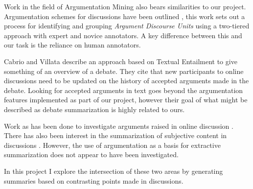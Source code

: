     Work in the field of Argumentation Mining also bears similarities to our project. Argumentation schemes for discussions have been outlined \cite{ghosh2014analyzing}, this work sets out a process for identifying and grouping \textit{Argument Discourse Units} using a two-tiered approach with expert and novice annotators. A key difference between this and our task is the reliance on human annotators.

    Cabrio and Villata \cite{cabrio2012combining} describe an approach based on Textual Entailment to give something of an overview of a debate. They cite that new participants to online discussions need to be updated on the history of accepted arguments made in the debate. Looking for accepted arguments in text goes beyond the argumentation features implemented as part of our project, however their goal of what might be described as debate summarization is highly related to ours.

    Work as has been done to investigate arguments raised in online discussion \cite{boltuzic2015identifying,cabrio2012combining,ghosh2014analyzing}. There has also been interest in the summarization of subjective content in discussions \cite{hu2004mining,lloret2009towards,galley2004identifying}. However, the use of argumentation as a basis for extractive summarization does not appear to have been investigated.

    In this project I explore the intersection of these two areas by generating summaries based on contrasting points made in discussions.
